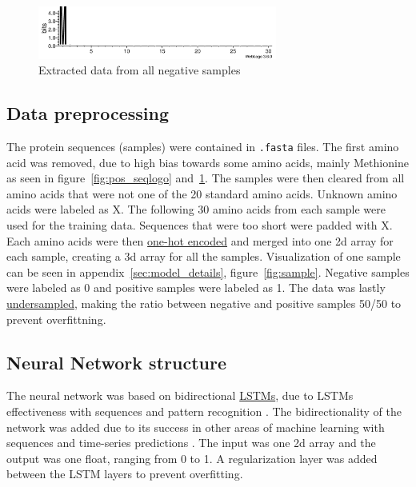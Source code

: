 \begin{figure}[H]
\centering
\includegraphics[width=0.7\textwidth]{pictures/train_neg_logo.png}
\caption{\label{fig:neg_seqlogo}Extracted data from all negative samples \cite{web_logo}}
\end{figure}

\subsection{Data preprocessing}

The protein sequences (samples) were contained in \verb|.fasta| files.
The first amino acid was removed, due to high bias towards some amino acids, mainly Methionine as seen in figure~\ref{fig:pos_seqlogo} and~\ref{fig:neg_seqlogo}.
The samples were then cleared from all amino acids that were not one of the 20 standard amino acids. Unknown amino acids were labeled as X.
The following 30 amino acids from each sample were used for the training data. Sequences that were too short were padded with X.
Each amino acids were then \href{https://en.wikipedia.org/wiki/One-hot}{one-hot encoded} and merged into one 2d array for each sample, creating a 3d array for all the samples. Visualization of one sample can be seen in appendix~\ref{sec:model_details}, figure~\ref{fig:sample}.
Negative samples were labeled as 0 and positive samples were labeled as 1.
The data was lastly \href{https://en.wikipedia.org/wiki/Oversampling_and_undersampling_in_data_analysis}{undersampled}, making the ratio between negative and positive samples 50/50 to prevent overfittning.

\subsection{Neural Network structure}
The neural network was based on bidirectional \href{http://colah.github.io/posts/2015-08-Understanding-LSTMs/}{LSTMs}, due to LSTMs effectiveness with sequences and pattern recognition \cite{rnn_effectiveness}. The bidirectionality of the network was added due to its success in other areas of machine learning with sequences and time-series predictions \cite{bidirectional_1} \cite{bidirectional_2}. The input was one 2d array and the output was one float, ranging from 0 to 1. A regularization layer was added between the LSTM layers to prevent overfitting.


